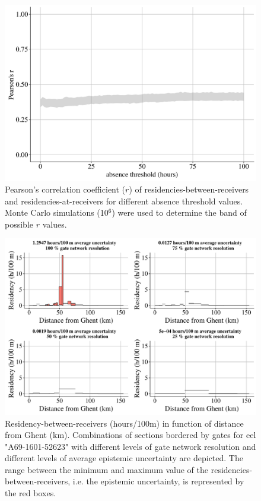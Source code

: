\begin{figure}[h!]
  \centering\includegraphics[scale=0.45]{correlation_activity_and_gate_period.pdf}
  \caption{Pearson's correlation coefficient ($r$) of residencies-between-receivers and residencies-at-receivers for different absence threshold values. Monte Carlo simulations (10$^{6}$) were used to determine the band of possible $r$ values.}
  \label{fig:correlation}
\end{figure}

\begin{figure}[h!]
  \centering\includegraphics[scale=0.45]{Resistance_model2_jb_eel2.pdf}
  \caption{Residency-between-receivers (hours/100m) in function of distance from Ghent (km). Combinations of sections bordered by gates for eel "A69-1601-52623" with different levels of gate network resolution and different levels of average epistemic uncertainty are depicted. The range between the minimum and maximum value of the residencies-between-receivers, i.e. the epistemic uncertainty, is represented by the red boxes.}
  \label{fig:Resistance_model2}
\end{figure}

